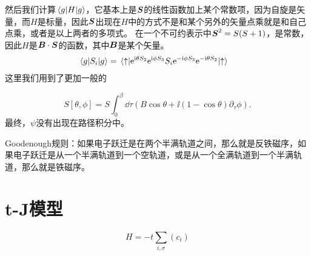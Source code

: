 然后我们计算$\mel*{g}{H}{g}$，它基本上是$\vb*{S}$的线性函数加上某个常数项，因为自旋是矢量，而$H$是标量，因此$\vb*{S}$出现在$H$中的方式不是和某个另外的矢量点乘就是和自己点乘，或者是以上两者的多项式。
在一个不可约表示中$\vb*{S}^2 = S(S+1)$，是常数，因此$H$是$\vb*{B} \cdot \vb*{S}$的函数，其中$\vb*{B}$是某个矢量。
\[
    \begin{aligned}
        \mel*{g}{S_i}{g} &= \mel*{\uparrow}{\mathrm{e}^{\mathrm{i} \theta S_2} \mathrm{e}^{\mathrm{i} \phi S_3} S_i \mathrm{e}^{- \mathrm{i} \phi S_3} \mathrm{e}^{- \mathrm{i} \theta S_2}}{\uparrow}
    \end{aligned}
\]
这里我们用到了更加一般的

\begin{equation}
    S[\theta, \phi] = S \int_0^\beta \dd{\tau} (B \cos \theta + \ii (1 - \cos \theta) \partial_\tau \phi).
\end{equation}
最终，$\psi$没有出现在路径积分中。

Goodenough规则：如果电子跃迁是在两个半满轨道之间，那么就是反铁磁序，如果电子跃迁是从一个半满轨道到一个空轨道，或是从一个全满轨道到一个半满轨道，那么就是铁磁序。

\section{t-J模型}

\begin{equation}
    H = - t \sum_{i, \sigma} (c_i)
\end{equation}